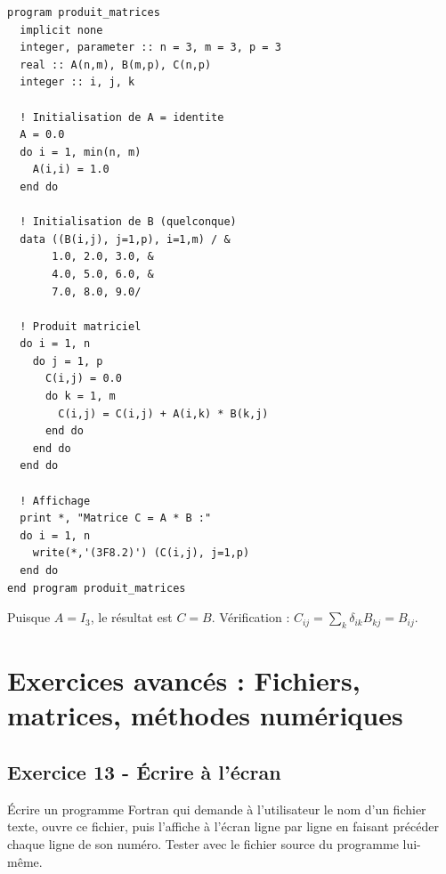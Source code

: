 \documentclass[12pt,a4paper]{article}
\begin{document}
\begin{boitecorrige}
\begin{lstlisting}
program produit_matrices
  implicit none
  integer, parameter :: n = 3, m = 3, p = 3
  real :: A(n,m), B(m,p), C(n,p)
  integer :: i, j, k

  ! Initialisation de A = identite
  A = 0.0
  do i = 1, min(n, m)
    A(i,i) = 1.0
  end do

  ! Initialisation de B (quelconque)
  data ((B(i,j), j=1,p), i=1,m) / &
       1.0, 2.0, 3.0, &
       4.0, 5.0, 6.0, &
       7.0, 8.0, 9.0/

  ! Produit matriciel
  do i = 1, n
    do j = 1, p
      C(i,j) = 0.0
      do k = 1, m
        C(i,j) = C(i,j) + A(i,k) * B(k,j)
      end do
    end do
  end do

  ! Affichage
  print *, "Matrice C = A * B :"
  do i = 1, n
    write(*,'(3F8.2)') (C(i,j), j=1,p)
  end do
end program produit_matrices
\end{lstlisting}

Puisque $A = I_3$, le résultat est $C = B$. Vérification : $C_{ij} = \sum_k \delta_{ik} B_{kj} = B_{ij}$.
\end{boitecorrige}


\newpage
\section{Exercices avancés : Fichiers, matrices, méthodes numériques}

\subsection*{Exercice 13 - Écrire à l'écran \niveau{\moyen}}

\begin{boiteexercice}
Écrire un programme Fortran qui demande à l'utilisateur le nom d'un fichier texte, ouvre ce fichier, puis l'affiche à l'écran ligne par ligne en faisant précéder chaque ligne de son numéro. Tester avec le fichier source du programme lui-même.
\end{boiteexercice}
\end{document}
